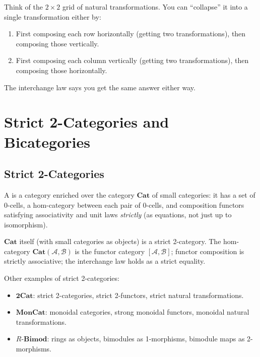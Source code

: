 \begin{dialog}
Think of the $2 \times 2$ grid of natural transformations. You can
``collapse'' it into a single transformation either by:
\begin{enumerate}
  \item First composing each row horizontally (getting two transformations),
        then composing those vertically.
  \item First composing each column vertically (getting two transformations),
        then composing those horizontally.
\end{enumerate}
The interchange law says you get the same answer either way.
\end{dialog}


\section{Strict 2-Categories and Bicategories}
\label{sec:bicategories}

\subsection{Strict 2-Categories}

A  is a category enriched over the category
$\mathbf{Cat}$ of small categories: it has a set of 0-cells, a hom-category
between each pair of 0-cells, and composition functors satisfying
associativity and unit laws \emph{strictly} (as equations, not just up to
isomorphism).

$\mathbf{Cat}$ itself (with small categories as objects) is a strict
2-category. The hom-category $\mathbf{Cat}(\mathcal{A}, \mathcal{B})$
is the functor category $[\mathcal{A}, \mathcal{B}]$; functor composition
is strictly associative; the interchange law holds as a strict equality.

Other examples of strict 2-categories:
\begin{itemize}
  \item $\mathbf{2Cat}$: strict 2-categories, strict 2-functors, strict
        natural transformations.
  \item $\mathbf{MonCat}$: monoidal categories, strong monoidal functors,
        monoidal natural transformations.
  \item $R\text{-}\mathbf{Bimod}$: rings as objects, bimodules as
        1-morphisms, bimodule maps as 2-morphisms.
\end{itemize}

